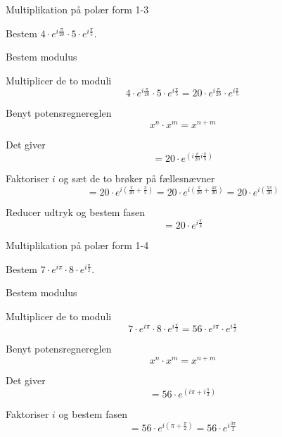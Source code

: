 \documentclass{article}
\begin{document}
\newpage

\begin{exercise}{Multiplikation på polær form 1-3}
	
	Bestem $4 \cdot e^{i \frac{\pi}{20}} \cdot 5 \cdot e^{i \frac{\pi}{5}}$.
	
	
	
	\hint 
	
	Bestem modulus
	
	
	\hint
	
	Multiplicer de to moduli 
	\[
	4 \cdot e^{i \frac{\pi}{20}} \cdot 5 \cdot e^{i \frac{\pi}{5}} = 20 \cdot e^{i \frac{\pi}{20}} \cdot e^{i \frac{\pi}{5}}
	\]
	
	\hint 
	
	Benyt potensregnereglen
	\[
	x^n \cdot x^m = x^{n+m}
	\]
	
	\hint
	
	Det giver
	\[
	=20 \cdot e^{(i \frac{\pi}{20}i \frac{\pi}{5})}
	\]
	
	\hint
	
	Faktoriser $i$ og sæt de to brøker på fællesnævner
	\[
	= 20 \cdot e^{i( \frac{\pi}{20} + \frac{\pi}{5})} = 20 \cdot e^{i( \frac{\pi}{20} + \frac{4 \pi}{20})} = 20 \cdot e^{i( \frac{5\pi}{20})}  
	\]
	
	\hint
	
	Reducer udtryk og bestem fasen
	\[
	= 20 \cdot e^{i \frac{\pi}{4}}
	\]
	
\end{exercise}


\newpage

\begin{exercise}{Multiplikation på polær form 1-4}
	
	Bestem $7 \cdot e^{i \pi} \cdot 8 \cdot e^{i \frac{\pi}{2}}$.
	
	
	
	\hint 
	
	Bestem modulus
	
	
	\hint
	
	Multiplicer de to moduli 
	\[
	7 \cdot e^{i \pi} \cdot 8 \cdot e^{i \frac{\pi}{2}} = 56 \cdot e^{i \pi} \cdot e^{i \frac{\pi}{2}}
	\]
	
	\hint 
	
	Benyt potensregnereglen
	\[
	x^n \cdot x^m = x^{n+m}
	\]
	
	\hint
	
	Det giver
	\[
	= 56 \cdot e^{(i \pi +i \frac{\pi}{2})}
	\]
	
	\hint
	
	Faktoriser $i$ og bestem fasen
	\[
	= 56 \cdot e^{i( \pi +\frac{\pi}{2})} = 56 \cdot e^{i \frac{3\pi}{2}}
	\]
	
	
\end{exercise}
\end{document}
